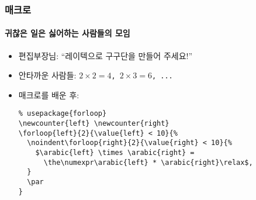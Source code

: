 
\begin{frame}[fragile]
  \frametitle{매크로}
  \framesubtitle{귀찮은 일은 싫어하는 사람들의 모임}
  \begin{itemize}
    \item<1-> 편집부장님: ``레이텍으로 구구단을 만들어 주세요!''
    \item<1-> 안타까운 사람들: \texttt{$2 \times 2 = 4$, $2 \times 3 = 6$, ...}
    \item<2-> 매크로를 배운 후:

    \vspace{-2em}\begin{verbatim}
% usepackage{forloop}
\newcounter{left} \newcounter{right}
\forloop{left}{2}{\value{left} < 10}{%
  \noindent\forloop{right}{2}{\value{right} < 10}{%
    $\arabic{left} \times \arabic{right} =
      \the\numexpr\arabic{left} * \arabic{right}\relax$,
  }
  \par
}
    \end{verbatim}
  \end{itemize}
\end{frame}

